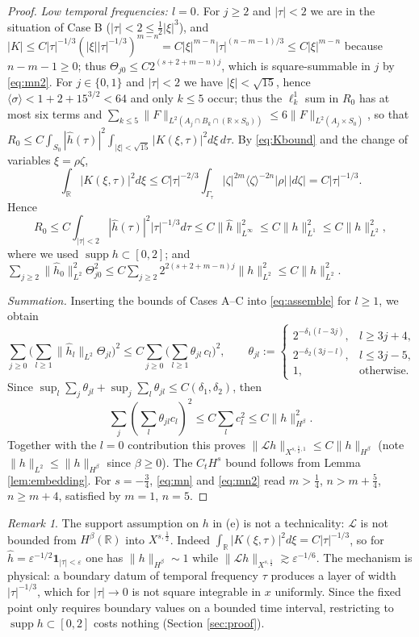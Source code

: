 \documentclass[10pt,reqno]{amsart}
\theoremstyle{remark}
\newtheorem{remark}[theorem]{Remark}
\numberwithin{equation}{section}
\newcommand{\R}{\mathbb R}
\newcommand{\supp}{\operatorname{supp}}
\newcommand{\ve}{\varepsilon}
\newcommand{\lan}{\langle}
\newcommand{\ran}{\rangle}
\newcommand{\Lc}{\mathcal{L}}
\newcommand{\sig}{\sigma}
\begin{document}
\begin{proof}
\emph{Low temporal frequencies: $l=0$.} For $j\ge2$ and $|\tau|<2$ we are in the situation of Case B ($|\tau|<2\le\frac12|\xi|^3$), and $|K|\le C|\tau|^{-1/3}(|\xi||\tau|^{-1/3})^{m-n}=C|\xi|^{m-n}|\tau|^{(n-m-1)/3}\le C|\xi|^{m-n}$ because $n-m-1\ge0$; thus $\Theta_{j0}\le C2^{(s+2+m-n)j}$, which is square-summable in $j$ by \eqref{eq:mn2}. For $j\in\{0,1\}$ and $|\tau|<2$ we have $|\xi|<\sqrt{15}$, hence $\lan\sig\ran<1+2+15^{3/2}<64$ and only $k\le5$ occur; thus the $\ell^1_k$ sum in $R_0$ has at most six terms and $\sum_{k\le5}\|F\|_{L^2(A_j\cap B_k\cap(\R\times S_0))}\le6\|F\|_{L^2(A_j\times S_0)}$, so that $R_0\le C\int_{S_0}|\widehat h(\tau)|^2\int_{|\xi|<\sqrt{15}}|K(\xi,\tau)|^2d\xi\,d\tau$. By \eqref{eq:Kbound} and the change of variables $\xi=\rho\zeta$,
$$\int_{\R}|K(\xi,\tau)|^2d\xi\le C|\tau|^{-2/3}\int_{\Gamma_\tau}|\zeta|^{2m}\lan\zeta\ran^{-2n}|\rho|\,|d\zeta|=C|\tau|^{-1/3}.$$
Hence $$R_0\leq C\int_{|\tau|<2}|\widehat h(\tau)|^2|\tau|^{-1/3}d\tau\le C\|\widehat h\|^2_{L^\infty}\le C\|h\|^2_{L^1}\le C\|h\|_{L^2}^2,$$ where we used $\supp h\subset[0,2]$; and $\sum_{j\ge2}\|\widehat h_0\|^2_{L^2}\Theta_{j0}^2\le C\sum_{j\ge2}2^{2(s+2+m-n)j}\|h\|^2_{L^2}\le C\|h\|_{L^2}^2$.

\emph{Summation.} Inserting the bounds of Cases A--C into \eqref{eq:assemble} for $l\ge1$, we obtain
$$\sum_{j\ge0}\Big(\sum_{l\ge1}\|\widehat h_l\|_{L^2}\Theta_{jl}\Big)^2\le C\sum_{j\ge0}\Big(\sum_{l\ge1}\theta_{jl}\,c_l\Big)^2,\qquad
\theta_{jl}:=\begin{cases}2^{-\delta_1(l-3j)},& l\ge3j+4,\\ 2^{-\delta_2(3j-l)},& l\le3j-5,\\ 1,&\text{otherwise.}\end{cases}$$
Since $\sup_l\sum_j\theta_{jl}+\sup_j\sum_l\theta_{jl}\le C(\delta_1,\delta_2)$, then $$\sum_j(\sum_l\theta_{jl}c_l)^2\le C\sum_lc_l^2\le C\|h\|^2_{H^\beta}.$$ Together with the $l=0$ contribution this proves $\|\Lc h\|_{X^{s,\frac12,1}}\le C\|h\|_{H^\beta}$ (note $\|h\|_{L^2}\le\|h\|_{H^\beta}$ since $\beta\ge0$). The $C_tH^s$ bound follows from Lemma \ref{lem:embedding}. For $s=-\frac34$, \eqref{eq:mn} and \eqref{eq:mn2} read $m>\frac14$, $n>m+\frac54$, $n\ge m+4$, satisfied by $m=1$, $n=5$.
\end{proof}

\begin{remark}\label{rem:support}
The support assumption on $h$ in (e) is not a technicality: $\Lc$ is not bounded from $H^\beta(\R)$ into $X^{s,\frac12}$. Indeed $\int_\R|K(\xi,\tau)|^2d\xi=C|\tau|^{-1/3}$, so for $\widehat h=\ve^{-1/2}\mathbf 1_{|\tau|<\ve}$ one has $\|h\|_{H^\beta}\sim1$ while $\|\Lc h\|_{X^{s,\frac12}}\gtrsim\ve^{-1/6}$. The mechanism is physical: a boundary datum of temporal frequency $\tau$ produces a layer of width $|\tau|^{-1/3}$, which for $|\tau|\to0$ is not square integrable in $x$ uniformly. Since the fixed point only requires boundary values on a bounded time interval, restricting to $\supp h\subset[0,2]$ costs nothing (Section \ref{sec:proof}).
\end{remark}
\end{document}
